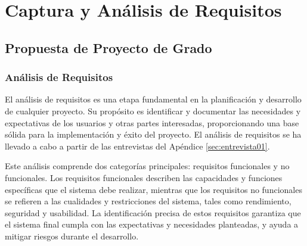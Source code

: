 \chapter{Captura y Análisis de Requisitos}
\label{sec:propuesta}

\section{Propuesta de Proyecto de Grado}


\subsection{Análisis de Requisitos}

El análisis de requisitos es una etapa fundamental en la planificación y desarrollo de cualquier proyecto. Su propósito es identificar y documentar las necesidades y expectativas de los usuarios y otras partes interesadas, proporcionando una base sólida para la implementación y éxito del proyecto. El análisis de requisitos se ha llevado a cabo a partir de las entrevistas del Apéndice \ref{sec:entrevista01}.

Este análisis comprende dos categorías principales: requisitos funcionales y no funcionales. Los requisitos funcionales describen las capacidades y funciones específicas que el sistema debe realizar, mientras que los requisitos no funcionales se refieren a las cualidades y restricciones del sistema, tales como rendimiento, seguridad y usabilidad. La identificación precisa de estos requisitos garantiza que el sistema final cumpla con las expectativas y necesidades planteadas, y ayuda a mitigar riesgos durante el desarrollo.

